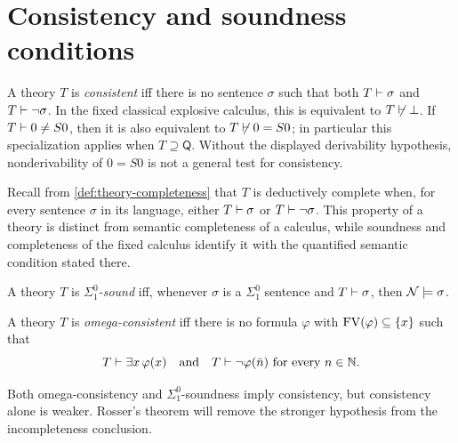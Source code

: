 \section{Consistency and soundness conditions}
\label{sec:first-incompleteness-02}

\begin{definition}[Consistency]
A theory \(T\) is \emph{consistent} iff there is no sentence \(\sigma\) such
that both \(T\vdash\sigma\) and \(T\vdash\neg\sigma\).  In the fixed
classical explosive calculus, this is equivalent to
\(T\not\vdash\bot\).  If \(T\vdash 0\ne S0\), then it is also
equivalent to \(T\not\vdash 0=S0\); in particular this specialization applies
when \(T\supseteq\mathsf Q\).  Without the displayed derivability hypothesis,
nonderivability of \(0=S0\) is not a general test for consistency.
\end{definition}

Recall from \cref{def:theory-completeness} that \(T\) is deductively complete
when, for every sentence \(\sigma\) in its language, either
\(T\vdash\sigma\) or \(T\vdash\neg\sigma\).  This property of a theory is
distinct from semantic completeness of a calculus, while soundness and
completeness of the fixed calculus identify it with the quantified semantic
condition stated there.

\begin{definition}
A theory \(T\) is \emph{\(\Sigma^0_1\)-sound} iff, whenever \(\sigma\) is a
\(\Sigma^0_1\) sentence and \(T\vdash\sigma\), then
\(\mathcal N\models\sigma\).
\end{definition}

\begin{definition}
A theory \(T\) is \emph{omega-consistent} iff there is no formula
\(\varphi\) with \(\operatorname{FV}(\varphi)\subseteq\{x\}\) such that
\[
  T\vdash\exists x\,\varphi(x)
  \quad\text{and}\quad
  T\vdash\neg\varphi(\bar n)
  \text{ for every }n\in\mathbb{N}.
\]
\end{definition}

Both omega-consistency and \(\Sigma^0_1\)-soundness imply consistency, but
consistency alone is weaker.  Rosser's theorem will remove the stronger
hypothesis from the incompleteness conclusion.


